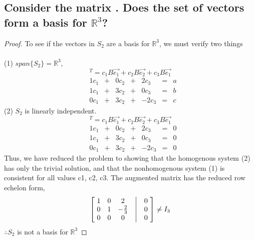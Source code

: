 \documentclass[../main.tex]{subfiles}
\begin{document}
\subsection[Consider the matrix $B$ Does the set of vectors \DS{\{ B\vec{e_1},B\vec{e_2},B\vec{e_3} \}} form a basis for $\mathbb{R}^3$?]
{Consider the matrix . Does the set of vectors  form a basis for $\mathbb{R}^3$?
}
\begin{proof}
  To see if the vectors in $S_{2}$ are a basis for $\mathbb{R}^3$, we must verify two things \\\\
  (1) $span\{S_{2}\} = \mathbb{R}^3$,
  \begin{equation*}
    [a\ b\ c]^{T} = c_{1}B\vec{e_1} + c_{2}B\vec{e_2} + c_{3}B\vec{e_1}
  \end{equation*}
  $$
    \begin{matrix}
      \  & 1c_{1} & + & 0c_{2} & + & 2c_{3}    & = & a\ \\
      \  & 1c_{1} & + & 3c_{2} & + & 0c_{3}    & = & b\ \\
      \  & 0c_{1} & + & 3c_{2} & + & {-2}c_{3} & = & c\
    \end{matrix}
  $$
  (2) $S_{2}$ is linearly independent.
  \begin{equation*}
    [0\ 0\ 0]^{T} = c_{1}B\vec{e_1} + c_{2}B\vec{e_2} + c_{3}B\vec{e_1}
  \end{equation*}
  $$
    \begin{matrix}
      \  & 1c_{1} & + & 0c_{2} & + & 2c_{3}    & = & 0\ \\
      \  & 1c_{1} & + & 3c_{2} & + & 0c_{3}    & = & 0\ \\
      \  & 0c_{1} & + & 3c_{2} & + & {-2}c_{3} & = & 0\
    \end{matrix}
  $$
  Thus, we have reduced the problem to showing that the homogenous system (2) has only the trivial solution, and that the nonhomogenous system (1) is consistent for all values c1, c2, c3.
  The augmented matrix has the reduced row echelon form,
  \begin{align*}
    \begin{bmatrix}
      \ 1 & 0 & 2            & \bigm| & 0\ \\
      \ 0 & 1 & -\frac{2}{3} & \bigm| & 0\ \\
      \ 0 & 0 & 0            & \bigm| & 0\
    \end{bmatrix}
    \neq I_{3}
  \end{align*}
  $\therefore S_{2}$ is not a basis for $\mathbb{R}^3$
\end{proof}
\end{document}

